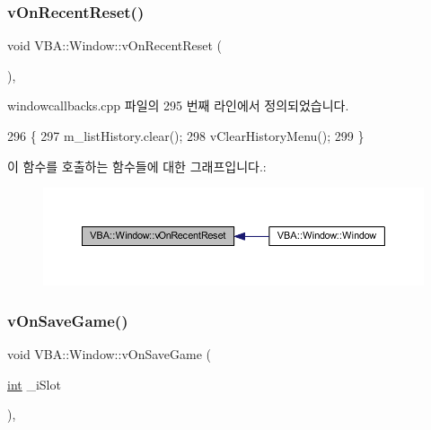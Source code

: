 \subsubsection{\texorpdfstring{v\+On\+Recent\+Reset()}{vOnRecentReset()}}
{\footnotesize\ttfamily void V\+B\+A\+::\+Window\+::v\+On\+Recent\+Reset (\begin{DoxyParamCaption}{ }\end{DoxyParamCaption})\hspace{0.3cm}{\ttfamily [protected]}, {\ttfamily [virtual]}}



windowcallbacks.\+cpp 파일의 295 번째 라인에서 정의되었습니다.


\begin{DoxyCode}
296 \{
297   m\_listHistory.clear();
298   vClearHistoryMenu();
299 \}
\end{DoxyCode}
이 함수를 호출하는 함수들에 대한 그래프입니다.\+:
\nopagebreak
\begin{figure}[H]
\begin{center}
\leavevmode
\includegraphics[width=350pt]{class_v_b_a_1_1_window_a8f8de1653cccaa5c61312c68f4a037fe_icgraph}
\end{center}
\end{figure}
\mbox{\label{class_v_b_a_1_1_window_aa614f13101a25febb6f3c3805c947e3e}} 
\subsubsection{\texorpdfstring{v\+On\+Save\+Game()}{vOnSaveGame()}}
{\footnotesize\ttfamily void V\+B\+A\+::\+Window\+::v\+On\+Save\+Game (\begin{DoxyParamCaption}\item[{\mbox{\hyperlink{_util_8cpp_a0ef32aa8672df19503a49fab2d0c8071}{int}}}]{\+\_\+i\+Slot }\end{DoxyParamCaption})\hspace{0.3cm}{\ttfamily [protected]}, {\ttfamily [virtual]}}



